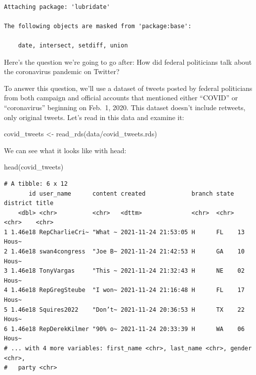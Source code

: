 \documentclass[
  letterpaper,
  DIV=11,
  numbers=noendperiod]{scrreprt}
\newenvironment{Shaded}{\begin{snugshade}}{\end{snugshade}}
\newcommand{\FunctionTok}[1]{\textcolor[rgb]{0.28,0.35,0.67}{#1}}
\newcommand{\NormalTok}[1]{\textcolor[rgb]{0.00,0.23,0.31}{#1}}
\newcommand{\OtherTok}[1]{\textcolor[rgb]{0.00,0.23,0.31}{#1}}
\newcommand{\StringTok}[1]{\textcolor[rgb]{0.13,0.47,0.30}{#1}}
\begin{document}
\begin{verbatim}

Attaching package: 'lubridate'

The following objects are masked from 'package:base':

    date, intersect, setdiff, union
\end{verbatim}

Here's the question we're going to go after: How did federal politicians
talk about the coronavirus pandemic on Twitter?

To answer this question, we'll use a dataset of tweets posted by federal
politicians from both campaign and official accounts that mentioned
either ``COVID'' or ``coronavirus'' beginning on Feb.~1, 2020. This
dataset doesn't include retweets, only original tweets. Let's read in
this data and examine it:

\begin{Shaded}
\begin{Highlighting}[]
\NormalTok{covid\_tweets }\OtherTok{\textless{}{-}} \FunctionTok{read\_rds}\NormalTok{(}\StringTok{\textquotesingle{}data/covid\_tweets.rds\textquotesingle{}}\NormalTok{)}
\end{Highlighting}
\end{Shaded}

We can see what it looks like with head:

\begin{Shaded}
\begin{Highlighting}[]
\FunctionTok{head}\NormalTok{(covid\_tweets)}
\end{Highlighting}
\end{Shaded}

\begin{verbatim}
# A tibble: 6 x 12
       id user_name      content created             branch state district title
    <dbl> <chr>          <chr>   <dttm>              <chr>  <chr> <chr>    <chr>
1 1.46e18 RepCharlieCri~ "What ~ 2021-11-24 21:53:05 H      FL    13       Hous~
2 1.46e18 swan4congress  "Joe B~ 2021-11-24 21:42:53 H      GA    10       Hous~
3 1.46e18 TonyVargas     "This ~ 2021-11-24 21:32:43 H      NE    02       Hous~
4 1.46e18 RepGregSteube  "I won~ 2021-11-24 21:16:48 H      FL    17       Hous~
5 1.46e18 Squires2022    "Don’t~ 2021-11-24 20:36:53 H      TX    22       Hous~
6 1.46e18 RepDerekKilmer "90% o~ 2021-11-24 20:33:39 H      WA    06       Hous~
# ... with 4 more variables: first_name <chr>, last_name <chr>, gender <chr>,
#   party <chr>
\end{verbatim}
\end{document}
